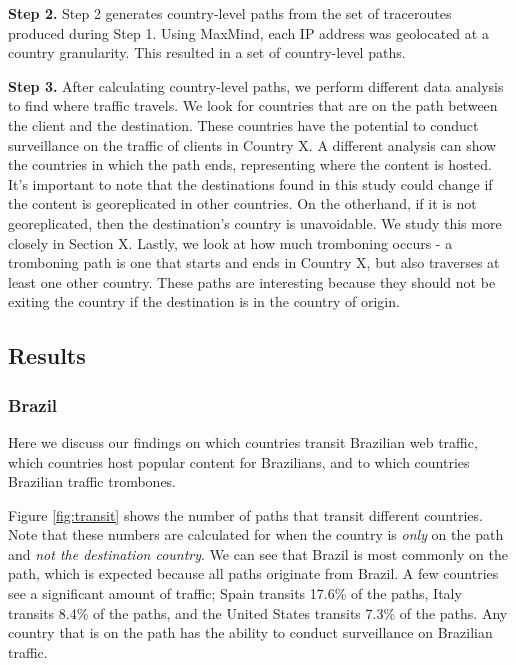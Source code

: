 {\bf Step 2.}  Step 2 generates country-level paths from the set of traceroutes produced during Step 1.  Using MaxMind, each IP address was geolocated at a country granularity.  This resulted in a set of country-level paths.

{\bf Step 3.}  After calculating country-level paths, we perform different data analysis to find where traffic travels.  We look for countries that are on the path between the client and the destination.  These countries have the potential to conduct surveillance on the traffic of clients in Country X.  A different analysis can show the countries in which the path ends, representing where the content is hosted.  It's important to note that the destinations found in this study could change if the content is georeplicated in other countries.  On the otherhand, if it is not georeplicated, then the destination's country is unavoidable.  We study this more closely in Section X.  Lastly, we look at how much tromboning occurs - a tromboning path is one that starts and ends in Country X, but also traverses at least one other country.  These paths are interesting because they should not be exiting the country if the destination is in the country of origin.  

\subsection{Results}

\subsubsection{Brazil}
Here we discuss our findings on which countries transit Brazilian web traffic, which countries host popular content for Brazilians, and to which countries Brazilian traffic trombones.  


Figure \ref{fig:transit} shows the number of paths that transit different countries.  Note that these numbers are calculated for when the country is \textit{only} on the path and \textit{not the destination country}.  We can see that Brazil is most commonly on the path, which is expected because all paths originate from Brazil.  A few countries see a significant amount of traffic; Spain transits 17.6\% of the paths, Italy transits 8.4\% of the paths, and the United States transits 7.3\% of the paths.  Any country that is on the path has the ability to conduct surveillance on Brazilian traffic.  

